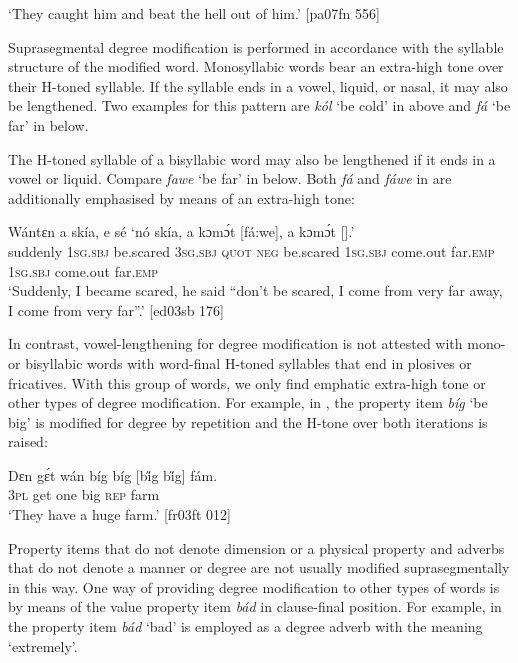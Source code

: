 \glt ‘They caught him and beat the hell out of him.’ [pa07fn 556]
\z

Suprasegmental degree modification is performed in accordance with the syllable structure of the modified word. Monosyllabic words bear an extra-high tone over their H-toned syllable. If the syllable ends in a vowel, liquid, or nasal, it may also be lengthened. Two examples for this pattern are \textit{kól} ‘be cold’ in  above and \textit{fá} ‘be far’ in  below.


The H-toned syllable of a bisyllabic word may also be lengthened if it ends in a vowel or liquid. Compare \textit{fawe} ‘be far’ in  below. Both \textit{fá} and \textit{fáwe} in  are additionally emphasised by means of an extra-high tone: 



\ea%
    \label{ex:key:895}
    \gll Wántɛn  a    skía,      e    sé  ‘nó  skía,      a    kɔmɔ́t
  [fá:we],  a    kɔmɔ́t        [].’\\
suddenly  \textsc{1sg.sbj}  be.scared  \textsc{3sg.sbj}  \textsc{quot}  \textsc{neg}  be.scared  \textsc{1sg.sbj}  come.out
far.\textsc{emp}      \textsc{1sg.sbj}  come.out  far.\textsc{emp}\\

\glt ‘Suddenly, I became scared, he said “don’t be scared, I come from very far away, 
I come from very far”.’ [ed03sb 176]
\z

In contrast, vowel-lengthening for degree modification is not attested with mono- or bisyllabic words with word-final H-toned syllables that end in plosives or fricatives. With this group of words, we only find emphatic extra-high tone or other types of degree modification. For example, in , the property item \textit{bíg} ‘be big’ is modified for degree by repetition and the H-tone over both iterations is raised: 


\ea%
    \label{ex:key:896}
    \gll Dɛn  gɛ́t  wán  bíg  bíg  [b\H{i}g b\H{i}g] fám.\\
\textsc{3pl}  get  one  big  \textsc{rep}      farm\\

\glt ‘They have a huge farm.’ [fr03ft 012]
\z

Property items that do not denote dimension or a physical property and adverbs that do not denote a manner or degree are not usually modified suprasegmentally in this way. One way of providing degree modification to other types of words is by means of the value property item \textit{bád} in clause-final position. For example, in  the property item \textit{bád} ‘bad’ is employed as a degree adverb with the meaning ‘extremely’. 


